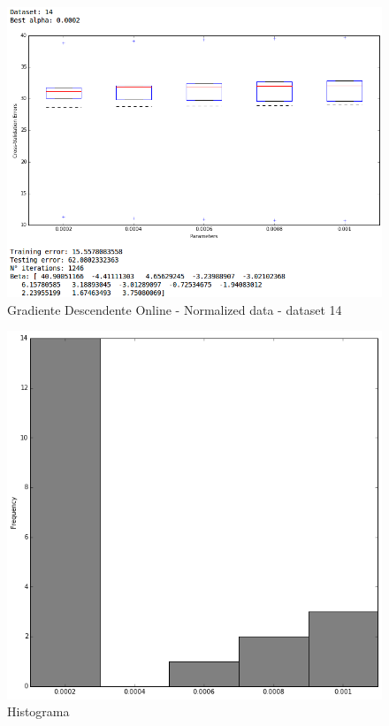 \documentclass[spanish, fleqn]{article}
\begin{document}
\begin{enumerate}
\begin{figure}[!htpb]
\centering
 \includegraphics[scale=0.45]{gd_online_norm14.png}
 \caption{Gradiente Descendente Online - Normalized data - dataset 14}
\end{figure}

\begin{figure}[!htpb]
\centering
 \includegraphics[scale=0.4]{hist_gd_online_norm.png}
 \caption{Histograma}
\end{figure}


\end{enumerate}
\end{document}
